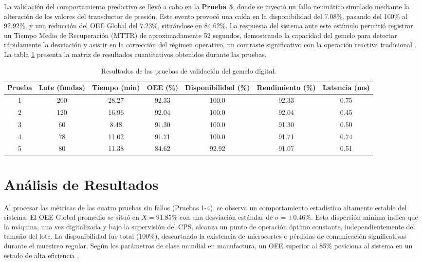 La validación del comportamiento predictivo se llevó a cabo en la \textbf{Prueba 5}, donde se inyectó un fallo neumático simulado mediante la alteración de los valores del transductor de presión. Este evento provocó una caída en la disponibilidad del 7.08\%, pasando del 100\% al 92.92\%, y una reducción del OEE Global del 7.23\%, situándose en 84.62\%. La respuesta del sistema ante este estímulo permitió registrar un Tiempo Medio de Recuperación (MTTR) de aproximadamente 52 segundos, demostrando la capacidad del gemelo para detectar rápidamente la desviación y asistir en la corrección del régimen operativo, un contraste significativo con la operación reactiva tradicional \cite{Tao2017DigitalTwin}. La tabla \ref{tab:resultados_pruebas} presenta la matriz de resultados cuantitativos obtenidos durante las pruebas.

\begin{table}[htbp]
\centering
\caption{Resultados de las pruebas de validación del gemelo digital.}
\label{tab:resultados_pruebas}
\begin{tabular}{|c|c|c|c|c|c|c|}
\hline
\textbf{Prueba} & \textbf{Lote (fundas)} & \textbf{Tiempo (min)} & \textbf{OEE (\%)} & \textbf{Disponibilidad (\%)} & \textbf{Rendimiento (\%)} & \textbf{Latencia (ms)} \\
\hline
1 & 200 & 28.27 & 92.33 & 100.0 & 92.33 & 0.75 \\
2 & 120 & 16.96 & 92.04 & 100.0 & 92.04 & 0.45 \\
3 & 60 & 8.48 & 91.30 & 100.0 & 91.30 & 0.50 \\
4 & 78 & 11.02 & 91.71 & 100.0 & 91.71 & 0.74 \\
5 & 80 & 11.38 & 84.62 & 92.92 & 91.07 & 0.51 \\
\hline
\end{tabular}
\end{table}

\section{Análisis de Resultados}

Al procesar las métricas de las cuatro pruebas sin fallos (Pruebas 1-4), se observa un comportamiento estadístico altamente estable del sistema. El OEE Global promedio se situó en $\bar{X} = 91.85\%$ con una desviación estándar de $\sigma = \pm 0.46\%$. Esta dispersión mínima indica que la máquina, una vez digitalizada y bajo la supervisión del CPS, alcanza un punto de operación óptimo constante, independientemente del tamaño del lote. La disponibilidad fue total ($100\%$), descartando la existencia de microcortes o pérdidas de comunicación significativas durante el muestreo regular. Según los parámetros de clase mundial en manufactura, un OEE superior al 85\% posiciona al sistema en un estado de alta eficiencia \cite{Muchiri2008OEE}.

